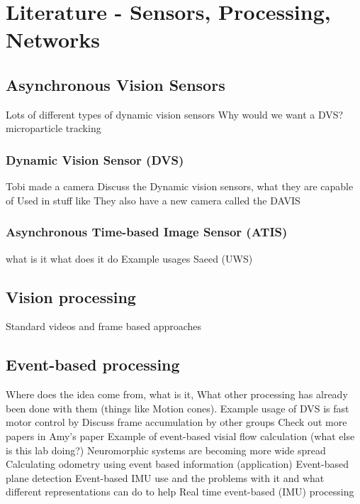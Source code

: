 \chapter{Literature - Sensors, Processing, Networks}


\section{Asynchronous Vision Sensors}  %
Lots of different types of dynamic vision sensors \cite{delbruck2010activity}
Why would we want a DVS? microparticle tracking \cite{ni2012asynchronous}

\subsection{Dynamic Vision Sensor (DVS)}
Tobi made a camera \cite{delbruck2008}
Discuss the Dynamic vision sensors, what they are capable of
Used in stuff like \cite{delbruck2007fast}
They also have a new camera called the DAVIS \cite{DAVIS}

\subsection{Asynchronous Time-based Image Sensor (ATIS)}
what is it what does it do \cite{posch2010high}
Example usages Saeed (UWS) \cite{afshar2016investigation}



\pagebreak
\section{Vision processing}   %
Standard videos and frame based approaches

\pagebreak
\section{Event-based processing}     %
Where does the idea come from, what is it, 
What other processing has already been done with them (things like Motion cones). 
Example usage of DVS is fast motor control by \cite{delbruck2007fast}
Discuss frame accumulation by other groups
Check out more papers in Amy's paper
Example of event-based visial flow calculation \cite{benosman2014event} (what else is this lab doing?)
Neuromorphic systems are becoming more wide spread \cite{delbruck2014research}
Calculating odometry using event based information (application) \cite{censi2014low}
Event-based plane detection \cite{afshar2016investigation}
Event-based IMU use and the problems with it and what different representations can do to help\cite{fida2015pre}
Real time event-based (IMU) processing \cite{fida2015real}


